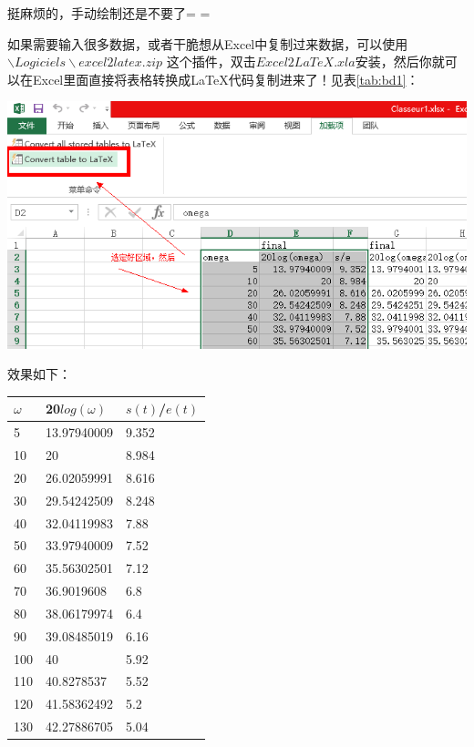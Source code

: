 \documentclass[12pt,a4paper,oneside]{book}
\begin{document}
{挺麻烦的，手动绘制还是不要了= =
\par
如果需要输入很多数据，或者干脆想从Excel中复制过来数据，可以使用$\backslash Logiciels\backslash excel2latex.zip$ 这个插件，双击$Excel2LaTeX.xla$安装，然后你就可以在Excel里面直接将表格转换成\LaTeX 代码复制进来了！见表\ref{tab:bd1}：
\par
\begin{minipage}{\linewidth}
\makebox[\linewidth]{}
\centering
{}
\includegraphics[scale=.66]{figures/xls.png}
\label{pic:xls}
\end{minipage}
\par
效果如下：
\par

\begin{minipage}{\linewidth}
\makebox[\linewidth]{}
  \centering
    \begin{tabular}{lll}
    \toprule
    $\omega$ & 20$log(\omega)$ & $s(t)$/$e(t)$ \\
    \midrule
    5     & 13.97940009 & 9.352 \\
    10    & 20    & 8.984 \\
    20    & 26.02059991 & 8.616 \\
    30    & 29.54242509 & 8.248 \\
    40    & 32.04119983 & 7.88 \\
    50    & 33.97940009 & 7.52 \\
    60    & 35.56302501 & 7.12 \\
    70    & 36.9019608 & 6.8 \\
    80    & 38.06179974 & 6.4 \\
    90    & 39.08485019 & 6.16 \\
    100   & 40    & 5.92 \\
    110   & 40.8278537 & 5.52 \\
    120   & 41.58362492 & 5.2 \\
    130   & 42.27886705 & 5.04 \\
    \bottomrule
    \end{tabular}%
  \label{tab:bd1}%
\end{minipage}%
\vspace{2em}
}
\end{document}
